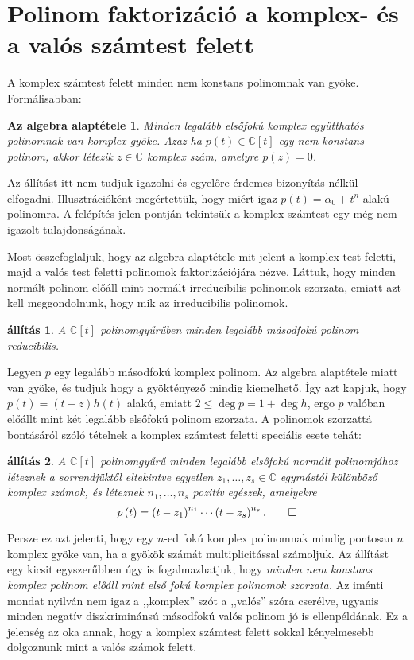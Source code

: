 \documentclass[9pt, a4paper, showtrims]{memoir}
\makeatletter
\renewenvironment{proof}[1][\proofname]
    {\par\pushQED{\qed}%
    \normalfont \topsep6\p@\@plus6\p@\relax
    \trivlist
    \item[\hskip\labelsep
        \itshape
    #1\@addpunct{:}]\ignorespaces}
    {\popQED\endtrivlist\@endpefalse}
\theoremstyle{plain}
\newtheorem{proposition}{állítás}[chapter]
\newtheorem*{FA}{Az algebra alaptétele}
\theoremstyle{remark}
\theoremstyle{definition}
\makeatother
\begin{document}
\section{Polinom faktorizáció a komplex- és a valós számtest felett}
A komplex számtest felett minden nem konstans polinomnak van gyöke.
Formálisabban:
\begin{FA}
	Minden legalább elsőfokú komplex együtthatós polinomnak van komplex gyöke.
	Azaz
	ha $p\left( t \right)\in\mathbb{C}[t]$ egy nem konstans polinom,
	akkor létezik $z\in\mathbb{C}$ komplex szám,
	amelyre $p\left( z \right)=0$.
\end{FA}
Az állítást itt nem tudjuk igazolni és egyelőre érdemes bizonyítás nélkül elfogadni.
Illusztrációként megértettük, hogy miért igaz $p\left( t \right)=\alpha_0+t^n$ alakú polinomra.
A felépítés jelen pontján tekintsük a komplex számtest egy még nem igazolt tulajdonságának.

Most összefoglaljuk, hogy az algebra alaptétele mit jelent a komplex test feletti, majd a valós test feletti polinomok
faktorizációjára nézve.
Láttuk, hogy minden normált polinom előáll mint normált irreducibilis polinomok szorzata,
emiatt azt kell meggondolnunk, hogy mik az irreducibilis polinomok.
\begin{proposition}
	A $\mathbb{C}\left[ t \right]$ polinomgyűrűben minden legalább másodfokú polinom reducibilis.
\end{proposition}
\begin{proof}
	Legyen $p$ egy legalább másodfokú komplex polinom.
	Az algebra alaptétele miatt van gyöke, és
	tudjuk hogy a gyöktényező mindig kiemelhető.
	Így azt kapjuk, hogy $p(t)=\left( t-z \right)h\left( t \right)$ alakú,
	emiatt $2\leq\deg p=1+\deg h$, ergo
	$p$ valóban előállt mint két legalább elsőfokú polinom szorzata.
\end{proof}
A polinomok szorzattá bontásáról szóló tételnek a komplex számtest feletti speciális esete tehát:
\begin{proposition}\label{pr:PolFact}
	A $\mathbb{C}[t]$ polinomgyűrű minden legalább elsőfokú normált polinomjához léteznek
	a sorrendjüktől eltekintve egyetlen $z_1,\ldots,z_s\in\mathbb{C}$ egymástól különböző komplex számok,
	és léteznek $n_1,\ldots,n_s$ pozitív egészek,
	amelyekre
	\[
		p\left( t \right)=
		\left( t-z_1 \right)^{n_1}
		\cdots
		\left( t-z_s\right)^{n_s}.\qedhere
	\]
\end{proposition}
Persze ez azt jelenti, hogy egy $n$-ed fokú komplex polinomnak mindig pontosan $n$ komplex gyöke van,
ha a gyökök számát multiplicitással számoljuk.
Az állítást egy kicsit egyszerűbben úgy is fogalmazhatjuk,
hogy
\emph{
	minden nem konstans komplex polinom előáll mint első fokú komplex polinomok szorzata.
}
Az iménti mondat nyilván nem igaz a ,,komplex'' szót a ,,valós'' szóra cserélve,
ugyanis minden negatív diszkriminánsú másodfokú valós polinom jó is ellenpéldának.
Ez a jelenség az oka annak,
hogy a komplex számtest felett sokkal kényelmesebb dolgoznunk mint a valós számok felett.
\end{document}
